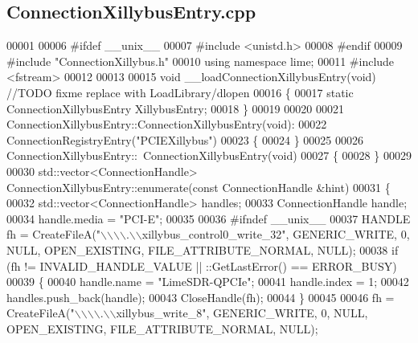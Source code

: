 \subsection{Connection\+Xillybus\+Entry.\+cpp}
\label{ConnectionXillybusEntry_8cpp_source}

\begin{DoxyCode}
00001 
00006 \textcolor{preprocessor}{#ifdef \_\_unix\_\_}
00007 \textcolor{preprocessor}{#include <unistd.h>}
00008 \textcolor{preprocessor}{#endif}
00009 \textcolor{preprocessor}{#include "ConnectionXillybus.h"}
00010 \textcolor{keyword}{using namespace }lime;
00011 \textcolor{preprocessor}{#include <fstream>}
00012 
00013 
00015 \textcolor{keywordtype}{void} __loadConnectionXillybusEntry(\textcolor{keywordtype}{void}) \textcolor{comment}{//TODO fixme replace with LoadLibrary/dlopen}
00016 \{
00017     \textcolor{keyword}{static} ConnectionXillybusEntry XillybusEntry;
00018 \}
00019 
00020 
00021 ConnectionXillybusEntry::ConnectionXillybusEntry(\textcolor{keywordtype}{void}):
00022     ConnectionRegistryEntry(\textcolor{stringliteral}{"PCIEXillybus"})
00023 \{
00024 \}
00025 
00026 ConnectionXillybusEntry::~ConnectionXillybusEntry(\textcolor{keywordtype}{void})
00027 \{
00028 \}
00029 
00030 std::vector<ConnectionHandle> ConnectionXillybusEntry::enumerate(\textcolor{keyword}{const} 
      ConnectionHandle &hint)
00031 \{
00032     std::vector<ConnectionHandle> handles;
00033     ConnectionHandle handle;
00034     handle.media = \textcolor{stringliteral}{"PCI-E"};
00035 
00036 \textcolor{preprocessor}{#ifndef \_\_unix\_\_}
00037     HANDLE fh = CreateFileA(\textcolor{stringliteral}{"\(\backslash\)\(\backslash\)\(\backslash\)\(\backslash\).\(\backslash\)\(\backslash\)xillybus\_control0\_write\_32"}, GENERIC\_WRITE, 0, NULL, OPEN\_EXISTING, 
      FILE\_ATTRIBUTE\_NORMAL, NULL);
00038     \textcolor{keywordflow}{if} (fh != INVALID\_HANDLE\_VALUE || ::GetLastError() == ERROR\_BUSY)
00039     \{
00040         handle.name = \textcolor{stringliteral}{"LimeSDR-QPCIe"};
00041         handle.index = 1;
00042         handles.push\_back(handle);
00043         CloseHandle(fh);
00044     \}
00045 
00046     fh = CreateFileA(\textcolor{stringliteral}{"\(\backslash\)\(\backslash\)\(\backslash\)\(\backslash\).\(\backslash\)\(\backslash\)xillybus\_write\_8"}, GENERIC\_WRITE, 0, NULL, OPEN\_EXISTING, 
      FILE\_ATTRIBUTE\_NORMAL, NULL);

\end{DoxyCode}
